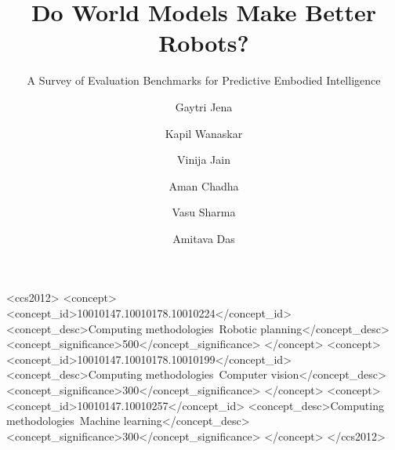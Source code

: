 \documentclass[manuscript,nonacm,oneside]{acmart}
\begin{document}
\title{Do World Models Make Better Robots?}
\subtitle{A Survey of Evaluation Benchmarks for Predictive Embodied Intelligence}

\author{Gaytri Jena}
\author{Kapil Wanaskar}
\author{Vinija Jain}
\author{Aman Chadha}
\author{Vasu Sharma}
\author{Amitava Das}
\renewcommand{\shortauthors}{Jena et al.}



\begin{CCSXML}
<ccs2012>
   <concept>
       <concept_id>10010147.10010178.10010224</concept_id>
       <concept_desc>Computing methodologies~Robotic planning</concept_desc>
       <concept_significance>500</concept_significance>
   </concept>
   <concept>
       <concept_id>10010147.10010178.10010199</concept_id>
       <concept_desc>Computing methodologies~Computer vision</concept_desc>
       <concept_significance>300</concept_significance>
   </concept>
   <concept>
       <concept_id>10010147.10010257</concept_id>
       <concept_desc>Computing methodologies~Machine learning</concept_desc>
       <concept_significance>300</concept_significance>
   </concept>
</ccs2012>
\end{CCSXML}


\maketitle









\clearpage



\clearpage
\appendix

\end{document}

